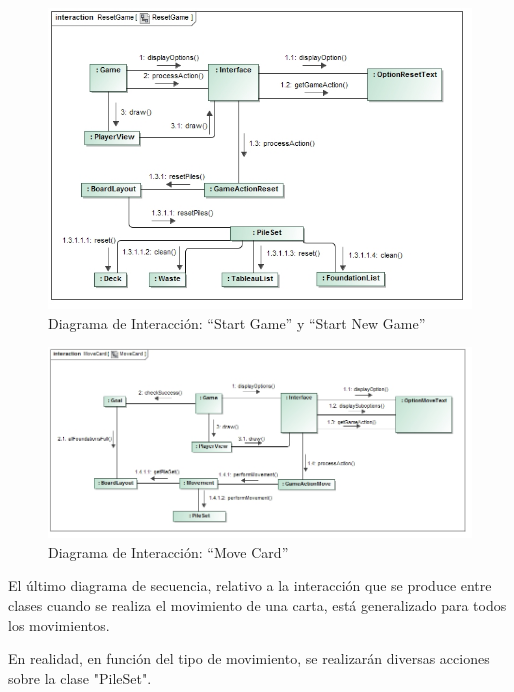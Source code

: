 \documentclass[11pt]{article}
\begin{document}
\begin{center}
 \begin{figure}[H]
 \begin{center}
   \includegraphics[width=16cm]{Analysis/ResetGameSequence00.jpg}
   \caption{Diagrama de Interacción: ``Start Game'' y ``Start New Game''}
   \label{fig:exitgamesequence}
 \end{center}
 \end{figure}
\end{center}

\begin{center}
 \begin{figure}[H]
 \begin{center}
   \includegraphics[width=17cm]{Analysis/MoveCardGenericSequence00.jpg}
   \caption{Diagrama de Interacción: ``Move Card''}
   \label{fig:movecardsequence}
 \end{center}
 \end{figure}
\end{center}

El último diagrama de secuencia, relativo a la interacción que se produce entre clases cuando se realiza el movimiento de una carta, está generalizado para todos los movimientos.

En realidad, en función del tipo de movimiento, se realizarán diversas acciones sobre la clase "PileSet". 
\end{document}
